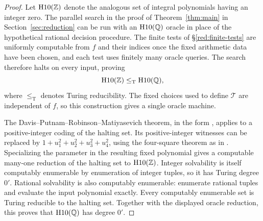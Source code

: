 \begin{proof}
Let \(\mathrm{H10}(\mathbb Z)\) denote the analogous set of integral polynomials
having an integer zero. The parallel search in the proof of Theorem~\ref{thm:main}
in Section~\ref{sec:reduction} can be run with
an \(\mathrm{H10}(\mathbb Q)\) oracle in place of the hypothetical rational
decision procedure. The finite tests of \S\ref{red:finite-tests} are
uniformly computable from \(f\) and their indices once the fixed
arithmetic data have been chosen, and each test uses finitely many oracle
queries. The search therefore halts on every input, proving
\[
                    \mathrm{H10}(\mathbb Z)\le_{\mathrm T}\mathrm{H10}(\mathbb Q),
\]
where \(\le_{\mathrm T}\) denotes Turing reducibility. The fixed choices
used to define \(\mathcal T\) are independent of \(f\), so this
construction gives a single oracle machine.

The Davis--Putnam--Robinson--Matiyasevich theorem, in the form
\cite[Theorem~8.1]{Davis1973}, applies to a positive-integer coding of
the halting set. Its positive-integer witnesses can be replaced by
\(1+u_1^2+u_2^2+u_3^2+u_4^2\), using the four-square theorem as in
\cite[p.~234]{Davis1973}. Specializing the parameter in the resulting
fixed polynomial gives a computable many-one reduction of the halting
set to \(\mathrm{H10}(\mathbb Z)\). Integer solvability is itself computably
enumerable by enumeration of integer tuples, so it has Turing degree
\(0'\). Rational solvability is also computably enumerable: enumerate
rational tuples and evaluate the input polynomial exactly. Every
computably enumerable set is Turing reducible to the halting set.
Together with the displayed oracle reduction, this proves that
\(\mathrm{H10}(\mathbb Q)\) has degree \(0'\).


\end{proof}
